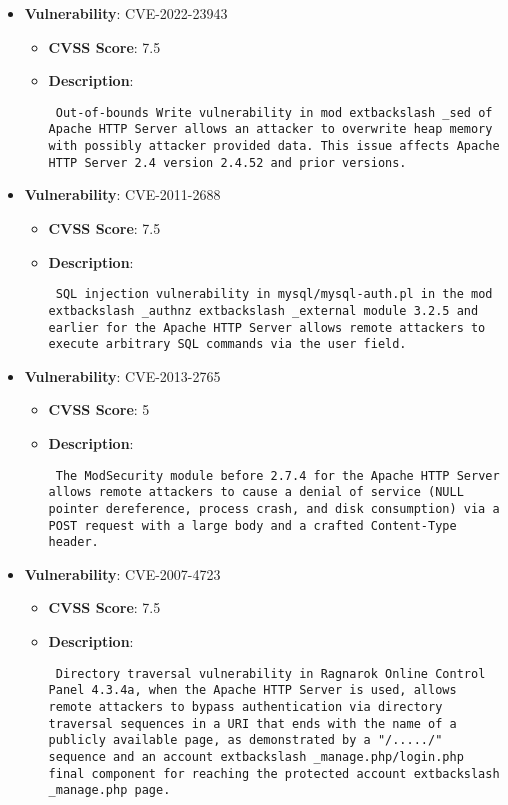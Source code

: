 \documentclass{article}
\begin{document}
\begin{itemize}
        \item \textbf{Vulnerability}: CVE-2022-23943
        \begin{itemize}
            \item \textbf{CVSS Score}:  7.5 
            \item \textbf{Description}: \parbox{\linewidth}{\texttt{ Out-of-bounds Write vulnerability in mod	extbackslash _sed of Apache HTTP Server allows an attacker to overwrite heap memory with possibly attacker provided data. This issue affects Apache HTTP Server 2.4 version 2.4.52 and prior versions. }}
        \end{itemize}
    
        \item \textbf{Vulnerability}: CVE-2011-2688
        \begin{itemize}
            \item \textbf{CVSS Score}:  7.5 
            \item \textbf{Description}: \parbox{\linewidth}{\texttt{ SQL injection vulnerability in mysql/mysql-auth.pl in the mod	extbackslash _authnz	extbackslash _external module 3.2.5 and earlier for the Apache HTTP Server allows remote attackers to execute arbitrary SQL commands via the user field. }}
        \end{itemize}
    
        \item \textbf{Vulnerability}: CVE-2013-2765
        \begin{itemize}
            \item \textbf{CVSS Score}:  5 
            \item \textbf{Description}: \parbox{\linewidth}{\texttt{ The ModSecurity module before 2.7.4 for the Apache HTTP Server allows remote attackers to cause a denial of service (NULL pointer dereference, process crash, and disk consumption) via a POST request with a large body and a crafted Content-Type header. }}
        \end{itemize}
    
        \item \textbf{Vulnerability}: CVE-2007-4723
        \begin{itemize}
            \item \textbf{CVSS Score}:  7.5 
            \item \textbf{Description}: \parbox{\linewidth}{\texttt{ Directory traversal vulnerability in Ragnarok Online Control Panel 4.3.4a, when the Apache HTTP Server is used, allows remote attackers to bypass authentication via directory traversal sequences in a URI that ends with the name of a publicly available page, as demonstrated by a "/...../" sequence and an account	extbackslash _manage.php/login.php final component for reaching the protected account	extbackslash _manage.php page. }}
        \end{itemize}
    

\end{itemize}
\end{document}
